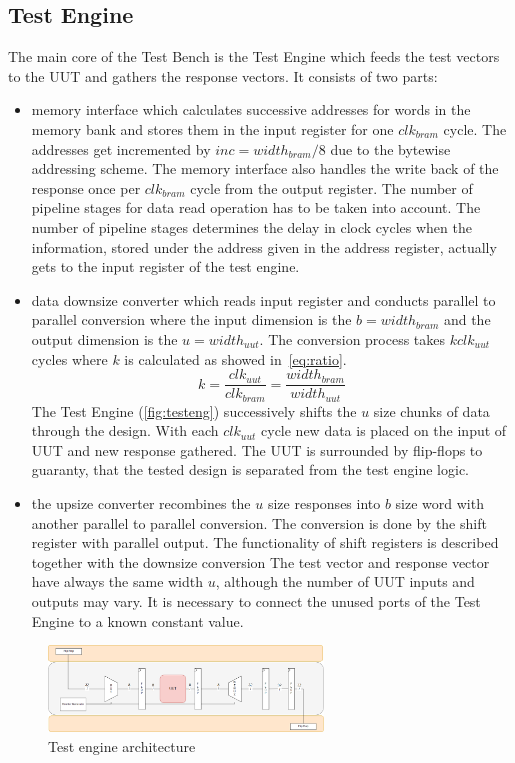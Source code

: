 \subsection{Test Engine}\label{ssec:engine}
The main core of the Test Bench is the Test Engine which feeds the test vectors to the UUT and gathers the response vectors. It consists of two parts:
\begin{itemize}
    \item memory interface which calculates successive addresses for words in the memory bank and stores them in the input register for one $clk_{bram}$ cycle. The addresses get incremented by $inc = width_{bram}/8$ due to the bytewise addressing scheme. The memory interface also handles the write back of the response once per $clk_{bram}$ cycle from the output register. The number of pipeline stages for data read operation has to be taken into account. The number of pipeline stages determines the delay in clock cycles when the information, stored under the address given in the address register, actually gets to the input register of the test engine.
    \item data downsize converter which reads input register and conducts parallel to parallel conversion where the input dimension is the $b=width_{bram}$ and the output dimension is the $u=width_{uut}$. The conversion process takes $k clk_{uut}$ cycles where $k$ is calculated as showed in~\autoref*{eq:ratio}.
    \begin{equation}
    k = \frac{clk_{uut}}{clk_{bram}} = \frac{width_{bram}}{width_{uut}}\label{eq:ratio}
    \end{equation}
    The Test Engine (\autoref{fig:testeng}) successively shifts the $u$ size chunks of data through the design. With each $clk_{uut}$ cycle new data is placed on the input of UUT and new response gathered. The UUT is surrounded by flip-flops to guaranty, that the tested design is separated from the test engine logic.
    \item the upsize converter recombines the $u$ size responses into $b$ size word with another parallel to parallel conversion. The conversion is done by the shift register with parallel output. The functionality of shift registers is described together with the downsize conversion The test vector and response vector have always the same width $u$, although the number of UUT inputs and outputs may vary. It is necessary to connect the unused ports of the Test Engine to a known constant value.
\end{itemize}
\begin{figure}[h]
\centering
\includegraphics[width=0.65\textwidth]{figures/Test_Engine_complex.png}
\caption{Test engine architecture}
\label{fig:testeng}
\end{figure}

